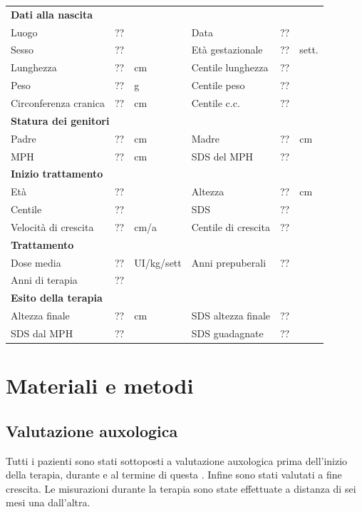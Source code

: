 \begin{table}[!h]
\begin{tabular}{lrllrl}
\toprule
\multicolumn{6}{l}{\textbf{Dati alla nascita}}\\
Luogo 		& \multicolumn{2}{l}{??} 	& Data 					& \multicolumn{2}{l}{??} 	\\
Sesso 		& \multicolumn{2}{l}{??} 	& Età gestazionale 		& ?? 		& sett.\\
Lunghezza 	& ?? 		& cm 				& Centile lunghezza		& ?? 		\\
Peso 		& ?? 		& g					& Centile peso			& ?? 		\\
Circonferenza cranica	& ?? 		& cm 	& Centile c.c.			& ?? \\
\midrule
\multicolumn{6}{l}{\textbf{Statura dei genitori}}\\
Padre 		& ?? & cm 	& Madre 				& ?? & cm \\
MPH 		& ?? & cm 	& SDS del MPH 			& ??\\
\midrule
\multicolumn{6}{l}{\textbf{Inizio trattamento}} \\
Età	& ?? & 		& Altezza 				& ?? & cm  \\
Centile & ?? 	 &		& SDS		& ?? \\
Velocità di crescita & ?? & cm/a	& Centile di crescita & ??\\
\midrule
\multicolumn{6}{l}{\textbf{Trattamento}} \\
Dose media		& ?? & UI/kg/sett & Anni prepuberali & ??\\
Anni di terapia & ??\\
\midrule
\multicolumn{6}{l}{\textbf{Esito della terapia}} \\
Altezza finale			& ?? & cm 	& SDS altezza finale		& ??\\
SDS dal MPH				& ?? &		& SDS guadagnate 			& ??\\
\bottomrule
\end{tabular}
\end{table}
\clearpage


\section{Materiali e metodi}

\subsection{Valutazione auxologica}
Tutti i pazienti sono stati sottoposti a valutazione auxologica prima dell'inizio della terapia, durante e al termine di questa . Infine sono stati valutati a fine crescita. Le misurazioni durante la terapia sono state effettuate a distanza di sei mesi una dall'altra.

